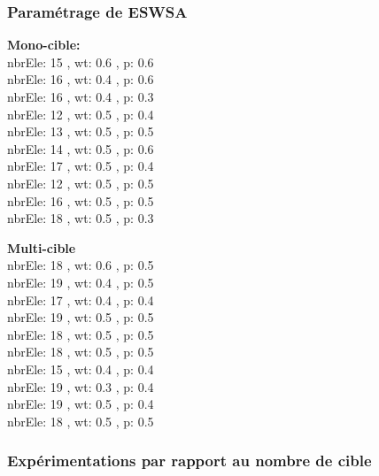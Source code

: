 \subsubsection{Paramétrage de ESWSA}
\noindent
\begin{minipage}[t]{0.55\textwidth}
	\textbf{Mono-cible:} \\
	nbrEle: 15 , wt: 0.6 , p: 0.6\\
	nbrEle: 16 , wt: 0.4 , p: 0.6\\
	nbrEle: 16 , wt: 0.4 , p: 0.3\\
	nbrEle: 12 , wt: 0.5 , p: 0.4\\
	nbrEle: 13 , wt: 0.5 , p: 0.5\\
	nbrEle: 14 , wt: 0.5 , p: 0.6\\
	nbrEle: 17 , wt: 0.5 , p: 0.4\\
	nbrEle: 12 , wt: 0.5 , p: 0.5\\
	nbrEle: 16 , wt: 0.5 , p: 0.5\\
	nbrEle: 18 , wt: 0.5 , p: 0.3\\
	
	
\end{minipage}\hfill
\hspace{0.2cm}
\begin{minipage}[t]{0.55\textwidth}
	\textbf{Multi-cible}\\
	nbrEle: 18 , wt: 0.6 , p: 0.5\\
	nbrEle: 19 , wt: 0.4 , p: 0.5\\
	nbrEle: 17 , wt: 0.4 , p: 0.4\\
	nbrEle: 19 , wt: 0.5 , p: 0.5\\
	nbrEle: 18 , wt: 0.5 , p: 0.5\\
	nbrEle: 18 , wt: 0.5 , p: 0.5\\
	nbrEle: 15 , wt: 0.4 , p: 0.4\\
	nbrEle: 19 , wt: 0.3 , p: 0.4\\
	nbrEle: 19 , wt: 0.5 , p: 0.4\\
	nbrEle: 18 , wt: 0.5 , p: 0.5\\
	
	
	
	
\end{minipage}\hfill


\subsubsection{Expérimentations par rapport au nombre de cible}

